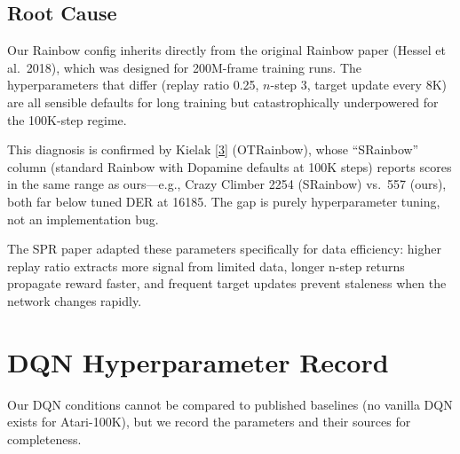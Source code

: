\documentclass[11pt]{article}
\newcommand{\citelink}[2]{\href{#1}{\small[#2]}}
\begin{document}
\subsection{Root Cause}

Our Rainbow config inherits directly from the original Rainbow paper
(Hessel et al.\ 2018), which was designed for 200M-frame training
runs. The hyperparameters that differ (replay ratio 0.25, $n$-step 3,
target update every 8K) are all sensible defaults for long training
but catastrophically underpowered for the 100K-step regime.

This diagnosis is confirmed by Kielak
\citelink{https://arxiv.org/abs/2003.10181}{3} (OTRainbow), whose
``SRainbow'' column (standard Rainbow with Dopamine defaults at 100K
steps) reports scores in the same range as ours---e.g., Crazy Climber
2254 (SRainbow) vs.\ 557 (ours), both far below tuned DER at 16185.
The gap is purely hyperparameter tuning, not an implementation bug.

The SPR paper adapted these parameters specifically for data
efficiency: higher replay ratio extracts more signal from limited
data, longer n-step returns propagate reward faster, and frequent
target updates prevent staleness when the network changes rapidly.

\section{DQN Hyperparameter Record}
\label{sec:dqn-params}

Our DQN conditions cannot be compared to published baselines (no
vanilla DQN exists for Atari-100K), but we record the parameters
and their sources for completeness.
\end{document}
